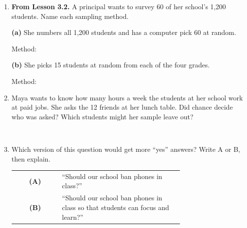 \documentclass[12pt]{article}
\begin{document}

\vspace{0.28in}

\begin{enumerate}[leftmargin=1.9em, itemsep=0.42in]

  \item \textbf{From Lesson 3.2.} A principal wants to survey 60 of her school's 1{,}200
        students. Name each sampling method.

        \vspace{12pt}
        \textbf{(a)} She numbers all 1{,}200 students and has a computer pick 60 at random.

        \vspace{8pt}
        Method: \blank{6.0cm}

        \vspace{12pt}
        \textbf{(b)} She picks 15 students at random from each of the four grades.

        \vspace{8pt}
        Method: \blank{6.0cm}

  \item Maya wants to know how many hours a week the students at her school work at paid jobs.
        She asks the 12 friends at her lunch table. Did chance decide who was asked? Which
        students might her sample leave out?

        \vspace{12pt}
        \writeline\\[18pt]\writeline

  \item Which version of this question would get more ``yes'' answers? Write A or B, then
        explain.

        \vspace{10pt}
        \begin{center}
        \renewcommand{\arraystretch}{1.4}
        \begin{tabular}{@{} c p{0.72\linewidth} @{}}
        \textbf{(A)} & ``Should our school ban phones in class?'' \\
        \textbf{(B)} & ``Should our school ban phones in class so that students can focus and
                       learn?'' \\
        \end{tabular}
        \end{center}
        \vspace{6pt}
        \writeline\\[18pt]\writeline\\[18pt]\writeline

\end{enumerate}
\end{document}
